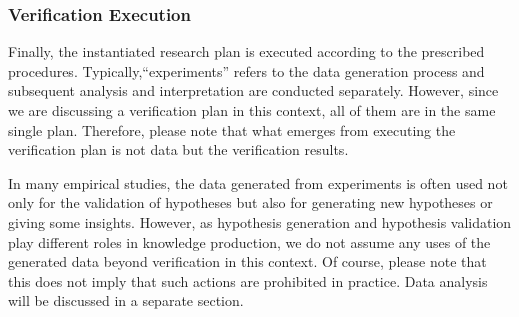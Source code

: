 \documentclass{book}
\begin{document}





\subsubsection{Verification Execution}
Finally, the instantiated research plan is executed according to the prescribed procedures. Typically,``experiments'' refers to the data generation process and subsequent analysis and interpretation are conducted separately. However, since we are discussing a verification plan in this context, all of them are in the same single plan. Therefore, please note that what emerges from executing the verification plan is not data but the verification results.

In many empirical studies, the data generated from experiments is often used not only for the validation of hypotheses but also for generating new hypotheses or giving some insights. However, as hypothesis generation and hypothesis validation play different roles in knowledge production, we do not assume any uses of the generated data beyond verification in this context. Of course, please note that this does not imply that such actions are prohibited in practice. Data analysis will be discussed in a separate section.
\end{document}
